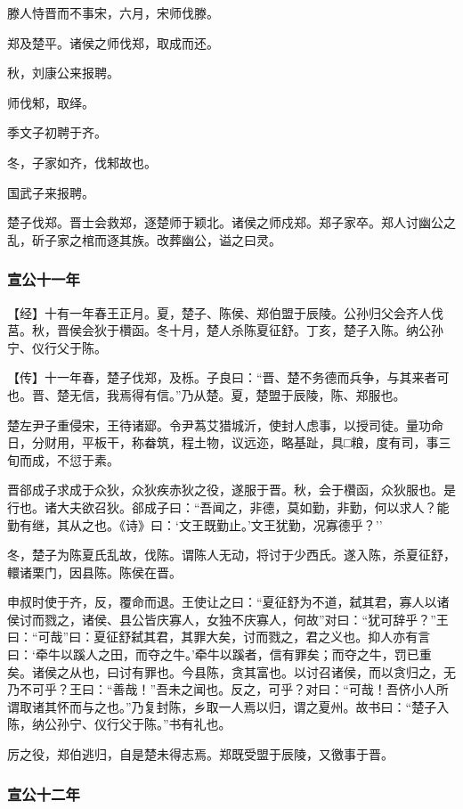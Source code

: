 \documentclass[]{article}
\begin{document}
滕人恃晋而不事宋，六月，宋师伐滕。

郑及楚平。诸侯之师伐郑，取成而还。

秋，刘康公来报聘。

师伐邾，取绎。

季文子初聘于齐。

冬，子家如齐，伐邾故也。

国武子来报聘。

楚子伐郑。晋士会救郑，逐楚师于颖北。诸侯之师戍郑。郑子家卒。郑人讨幽公之乱，斫子家之棺而逐其族。改葬幽公，谥之曰灵。

\hypertarget{header-n1412}{%
\subsubsection{宣公十一年}\label{header-n1412}}

【经】十有一年春王正月。夏，楚子、陈侯、郑伯盟于辰陵。公孙归父会齐人伐莒。秋，晋侯会狄于欑函。冬十月，楚人杀陈夏征舒。丁亥，楚子入陈。纳公孙宁、仪行父于陈。

【传】十一年春，楚子伐郑，及栎。子良曰：``晋、楚不务德而兵争，与其来者可也。晋、楚无信，我焉得有信。''乃从楚。夏，楚盟于辰陵，陈、郑服也。

楚左尹子重侵宋，王待诸郔。令尹蒍艾猎城沂，使封人虑事，以授司徒。量功命日，分财用，平板干，称畚筑，程土物，议远迩，略基趾，具□粮，度有司，事三旬而成，不愆于素。

晋郤成子求成于众狄，众狄疾赤狄之役，遂服于晋。秋，会于欑函，众狄服也。是行也。诸大夫欲召狄。郤成子曰：``吾闻之，非德，莫如勤，非勤，何以求人？能勤有继，其从之也。《诗》曰：`文王既勤止。'文王犹勤，况寡德乎？''

冬，楚子为陈夏氏乱故，伐陈。谓陈人无动，将讨于少西氏。遂入陈，杀夏征舒，轘诸栗门，因县陈。陈侯在晋。

申叔时使于齐，反，覆命而退。王使让之曰：``夏征舒为不道，弑其君，寡人以诸侯讨而戮之，诸侯、县公皆庆寡人，女独不庆寡人，何故''对曰：``犹可辞乎？''王曰：``可哉''曰：夏征舒弑其君，其罪大矣，讨而戮之，君之义也。抑人亦有言曰：`牵牛以蹊人之田，而夺之牛。'牵牛以蹊者，信有罪矣；而夺之牛，罚已重矣。诸侯之从也，曰讨有罪也。今县陈，贪其富也。以讨召诸侯，而以贪归之，无乃不可乎？王曰：``善哉！''吾未之闻也。反之，可乎？对曰：``可哉！吾侪小人所谓取诸其怀而与之也。''乃复封陈，乡取一人焉以归，谓之夏州。故书曰：``楚子入陈，纳公孙宁、仪行父于陈。''书有礼也。

厉之役，郑伯逃归，自是楚未得志焉。郑既受盟于辰陵，又徼事于晋。

\hypertarget{header-n1422}{%
\subsubsection{宣公十二年}\label{header-n1422}}
\end{document}
